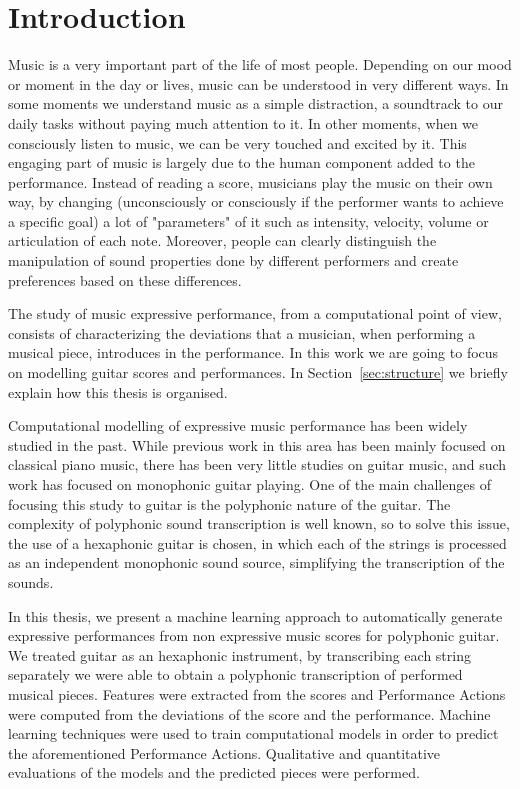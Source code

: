 \normallinespacing

\chapter{Introduction}

\label{chap:introduction}
Music is a very important part of the life of most people. Depending on our mood or moment in the day or lives, music can be understood in very different ways. In some moments we understand music as a simple distraction, a soundtrack to our daily tasks without paying much attention to it. In other moments, when we consciously listen to music, we can be very touched and excited by it. This engaging part of music is largely due to the human component added to the performance. Instead of reading a score, musicians play the music on their own way, by changing (unconsciously or consciously if the performer wants to achieve a specific goal) a lot of "parameters" of it such as intensity, velocity, volume or articulation of each note. Moreover, people can clearly distinguish the manipulation of sound properties done by different performers and create preferences based on these differences. 

The study of music expressive performance, from a computational point of view, consists of characterizing the deviations that a musician, when performing a musical piece, introduces in the performance. In this work we are going to focus on modelling guitar scores and performances. In Section~\ref{sec:structure} we briefly explain how this thesis is organised. 

Computational modelling of expressive music performance has been widely studied in the past. While previous work in this area has been mainly focused on classical piano music, there has been very little studies on guitar music, and such work has focused on monophonic guitar playing. One of the main challenges of focusing this study to guitar is the polyphonic nature of the guitar. The complexity of polyphonic sound transcription is well known, so to solve this issue, the use of a hexaphonic guitar is chosen, in which each of the strings is processed as an independent monophonic sound source, simplifying the transcription of the sounds. 

In this thesis, we present a machine learning approach to automatically generate expressive performances from non expressive music scores for polyphonic guitar. We treated guitar as an hexaphonic instrument, by transcribing each string separately we were able to obtain a polyphonic transcription of performed musical pieces. Features were extracted from the scores and Performance Actions were computed from the deviations of the score and the performance. Machine learning techniques were used to train computational models in order to predict the aforementioned Performance Actions. Qualitative and quantitative evaluations of the models and the predicted pieces were performed. 


